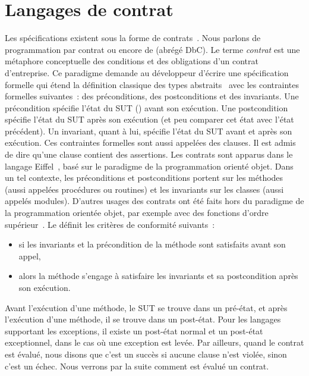 \section{Langages de contrat}
\label{section:sota:bisl}

Les spécifications existent sous la forme de {\strong contrats}~. Nous parlons de programmation par contrat ou encore de
 (abrégé DbC). Le terme {\em contrat} est une
métaphore conceptuelle des conditions et des obligations d'un contrat
d'entreprise. Ce paradigme demande au développeur d'écrire une spécification
formelle qui étend la définition classique des types abstraits~
avec les contraintes formelles suivantes~: des {\strong préconditions}, des
{\strong postconditions} et des {\strong invariants}. Une précondition spécifie
l'état du SUT () avant son exécution. Une
postcondition spécifie l'état du SUT après son exécution (et peu comparer cet
état avec l'état précédent). Un invariant, quant à lui, spécifie l'état du SUT
avant et après son exécution.  Ces contraintes formelles sont aussi appelées des
{\strong clauses}. Il est admis de dire qu'une clause contient des {\strong
assertions}. Les contrats sont apparus dans le langage Eiffel~,
basé sur le paradigme de la programmation orienté objet. Dans un tel contexte,
les préconditions et postconditions portent sur les méthodes (aussi appelées
procédures ou routines) et les invariants sur les classes (aussi appelés
modules). D'autres usages des contrats ont été faits hors du paradigme de la
programmation orientée objet, par exemple avec des fonctions d'ordre
supérieur~. Le  définit les
critères de conformité suivants~:
%
\begin{itemize}

\item si les invariants et la précondition de la méthode sont satisfaits avant
son appel,

\item alors la méthode s'engage à satisfaire les invariants et sa postcondition
après son exécution.

\end{itemize}
%
Avant l'exécution d'une méthode, le SUT se trouve dans un {\strong pré-état}, et
après l'exécution d'une méthode, il se trouve dans un {\strong post-état}. Pour
les langages supportant les exceptions, il existe un post-état normal et un
post-état exceptionnel, dans le cas où une exception est levée. Par ailleurs,
quand le contrat est évalué, nous disons que c'est un {\strong succès} si aucune
clause n'est violée, sinon c'est un {\strong échec}. Nous verrons par la suite
comment est évalué un contrat.

